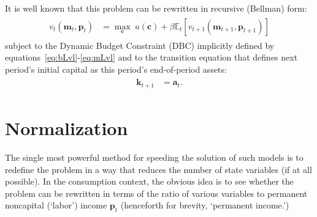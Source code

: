 \documentclass[titlepage, headings=optiontotocandhead]{econtex}
\begin{document}
It is well known that this problem can be rewritten in recursive (Bellman) form:
  \begin{equation}\begin{gathered}\begin{aligned}
        v_{t}(\mathbf{m}_{t},\mathbf{p}_{t})  & = \max_{\mathbf{c}}~ u(\mathbf{c}) + \beta {\mathbb{E}}_{t}[ v_{t+1}(\mathbf{m}_{t+1},\mathbf{p}_{t+1})]\label{eq:vrecurse}
      \end{aligned}\end{gathered}\end{equation}
subject to the Dynamic Budget Constraint (DBC) implicitly defined by equations~\eqref{eq:bLvl}-\eqref{eq:mLvl} and to the transition equation that defines next period's initial capital as this period's end-of-period assets:
\begin{equation}\begin{gathered}\begin{aligned}
      \mathbf{k}_{t+1} & = \mathbf{a}_{t}. \label{eq:transitionstate}
    \end{aligned}\end{gathered}\end{equation}


\hypertarget{normalization}{}
\section{Normalization}\label{sec:normalization}

The single most powerful method for speeding the solution of such models is to redefine the problem in a way that reduces the number of state variables (if at all possible).  In the consumption context, the obvious idea is to see whether the problem can be rewritten in terms of the ratio of various variables to permanent noncapital (`labor') income $\mathbf{p}_{t}$ (henceforth for brevity, `permanent income.')
\end{document}
